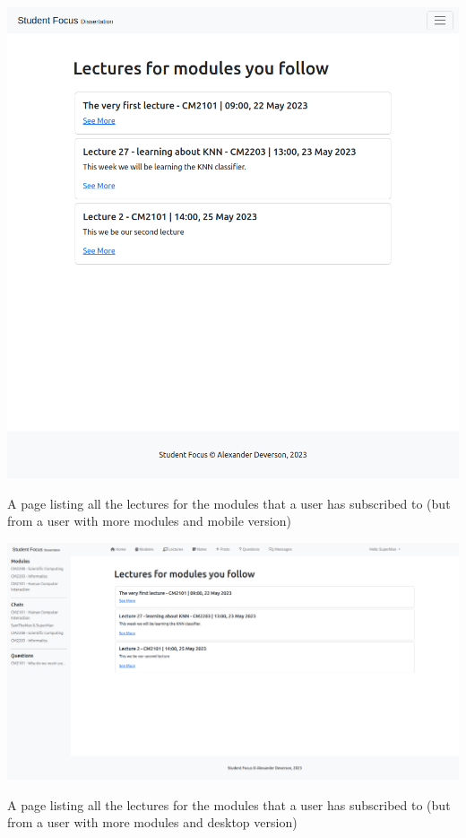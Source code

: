 \includegraphics[scale=0.20]{images/application/38 - lecture_list_more.png}

A page listing all the lectures for the modules that a user has subscribed to (but from a user with more modules and mobile version)

\includegraphics[scale=0.20]{images/application/39 - lecture_list_more.png}

A page listing all the lectures for the modules that a user has subscribed to (but from a user with more modules and desktop version)

